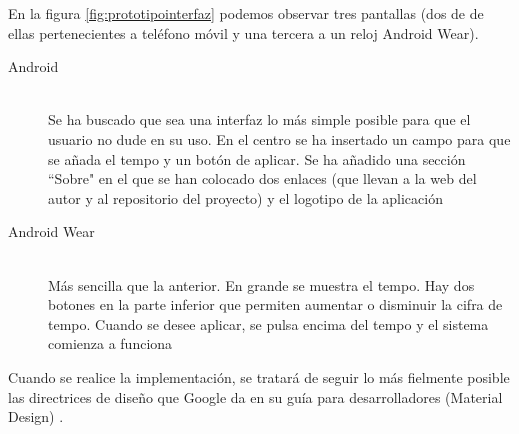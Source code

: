 En la figura \ref{fig:prototipointerfaz} podemos observar tres pantallas (dos de de ellas
pertenecientes a teléfono móvil y una tercera a un reloj Android Wear).

\begin{description}
  \item[Android] \hfill \\
    Se ha buscado que sea una interfaz lo más simple posible para que el usuario no dude
    en su uso. En el centro se ha insertado un campo para que se añada el tempo y un botón de aplicar.
    Se ha añadido una sección ``Sobre" en el que se han colocado dos enlaces (que
    llevan a la web del autor y al repositorio del proyecto) y el logotipo de la aplicación
  \item[Android Wear] \hfill \\
    Más sencilla que la anterior. En grande se muestra el tempo. Hay dos botones en la parte inferior que permiten
    aumentar o disminuir la cifra de tempo. Cuando se desee aplicar, se pulsa encima del tempo y el sistema
    comienza a funciona
\end{description}

Cuando se realice la implementación, se tratará de seguir lo más fielmente posible las directrices de diseño que
Google da en su guía para desarrolladores (Material Design) \cite{googlematerial}.
